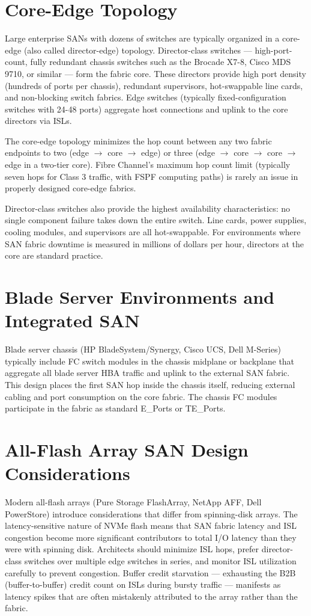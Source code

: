 \section{Core-Edge Topology}
Large enterprise SANs with dozens of switches are typically organized in a core-edge (also called director-edge) topology. Director-class switches --- high-port-count, fully redundant chassis switches such as the Brocade X7-8, Cisco MDS 9710, or similar --- form the fabric core. These directors provide high port density (hundreds of ports per chassis), redundant supervisors, hot-swappable line cards, and non-blocking switch fabrics. Edge switches (typically fixed-configuration switches with 24-48 ports) aggregate host connections and uplink to the core directors via ISLs.

The core-edge topology minimizes the hop count between any two fabric endpoints to two (edge $\rightarrow$ core $\rightarrow$ edge) or three (edge $\rightarrow$ core $\rightarrow$ core $\rightarrow$ edge in a two-tier core). Fibre Channel's maximum hop count limit (typically seven hops for Class 3 traffic, with FSPF computing paths) is rarely an issue in properly designed core-edge fabrics.

Director-class switches also provide the highest availability characteristics: no single component failure takes down the entire switch. Line cards, power supplies, cooling modules, and supervisors are all hot-swappable. For environments where SAN fabric downtime is measured in millions of dollars per hour, directors at the core are standard practice.

\section{Blade Server Environments and Integrated SAN}
Blade server chassis (HP BladeSystem/Synergy, Cisco UCS, Dell M-Series) typically include FC switch modules in the chassis midplane or backplane that aggregate all blade server HBA traffic and uplink to the external SAN fabric. This design places the first SAN hop inside the chassis itself, reducing external cabling and port consumption on the core fabric. The chassis FC modules participate in the fabric as standard E\_Ports or TE\_Ports.

\section{All-Flash Array SAN Design Considerations}
Modern all-flash arrays (Pure Storage FlashArray, NetApp AFF, Dell PowerStore) introduce considerations that differ from spinning-disk arrays. The latency-sensitive nature of NVMe flash means that SAN fabric latency and ISL congestion become more significant contributors to total I/O latency than they were with spinning disk. Architects should minimize ISL hops, prefer director-class switches over multiple edge switches in series, and monitor ISL utilization carefully to prevent congestion. Buffer credit starvation --- exhausting the B2B (buffer-to-buffer) credit count on ISLs during bursty traffic --- manifests as latency spikes that are often mistakenly attributed to the array rather than the fabric.

